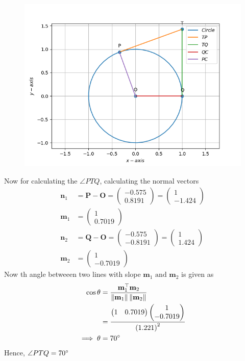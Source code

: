 \documentclass[12pt]{article}
\providecommand{\brak}[1]{\ensuremath{\left(#1\right)}}
\providecommand{\norm}[1]{\left\lVert#1\right\rVert}
\newcommand{\myvec}[1]{\ensuremath{\begin{pmatrix}#1\end{pmatrix}}}
\let\vec\mathbf
\begin{document}
\begin{figure}[!h]
	\begin{center} 
	    \includegraphics[width=\columnwidth]{figs/tan2}
	\end{center}
\caption{}
\label{fig:Fig1}
\end{figure}
Now for calculating the $\angle{PTQ}$, calculating the normal vectors
\begin{align}
	\vec{n}_1 &= \vec{P}-\vec{O} = \myvec{-0.575\\0.8191} = \myvec{1\\-1.424}\\
	\vec{m}_1 &= \myvec{1\\0.7019}\\
	\vec{n}_2 &= \vec{Q}-\vec{O} = \myvec{-0.575\\-0.8191} = \myvec{1\\1.424}\\
	\vec{m}_2 &= \myvec{1\\-0.7019}
\end{align}
Now th angle betweeen two lines with slope $\vec{m}_1 \text{ and } \vec{m}_2$ is given as
\begin{align}
	\cos\theta &= \frac{\vec{m}_1 ^\top \vec{m}_2}{\norm{\vec{m}_1}\norm{\vec{m}_2}}\\
	&=\frac{\myvec{1&0.7019}\myvec{1\\-0.7019}}{\brak{1.221}^2}\\
	\implies \theta &= 70\degree
\end{align}
Hence, $\angle{PTQ} = 70\degree$
\end{document}

